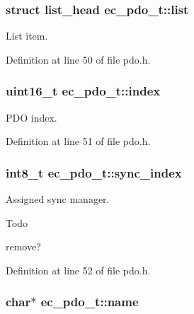\subsubsection[{list}]{\setlength{\rightskip}{0pt plus 5cm}struct list\-\_\-head {\bf ec\-\_\-pdo\-\_\-t\-::list}}\label{structec__pdo__t_aa7e6a0e0405c93414052c6d998d604ad}


\-List item. 



\-Definition at line 50 of file pdo.\-h.

\subsubsection[{index}]{\setlength{\rightskip}{0pt plus 5cm}uint16\-\_\-t {\bf ec\-\_\-pdo\-\_\-t\-::index}}\label{structec__pdo__t_ae319ba9b8bed2ac49cf6596ff690cfdd}


\-P\-D\-O index. 



\-Definition at line 51 of file pdo.\-h.

\subsubsection[{sync\-\_\-index}]{\setlength{\rightskip}{0pt plus 5cm}int8\-\_\-t {\bf ec\-\_\-pdo\-\_\-t\-::sync\-\_\-index}}\label{structec__pdo__t_ade04e761df137353930d271ed34120c9}


\-Assigned sync manager. 

\begin{DoxyRefDesc}{\-Todo}
\item[{\bf \-Todo}]remove? \end{DoxyRefDesc}


\-Definition at line 52 of file pdo.\-h.

\subsubsection[{name}]{\setlength{\rightskip}{0pt plus 5cm}char$\ast$ {\bf ec\-\_\-pdo\-\_\-t\-::name}}\label{structec__pdo__t_aee9c14db0de4c72475b8975d5630ad94}


